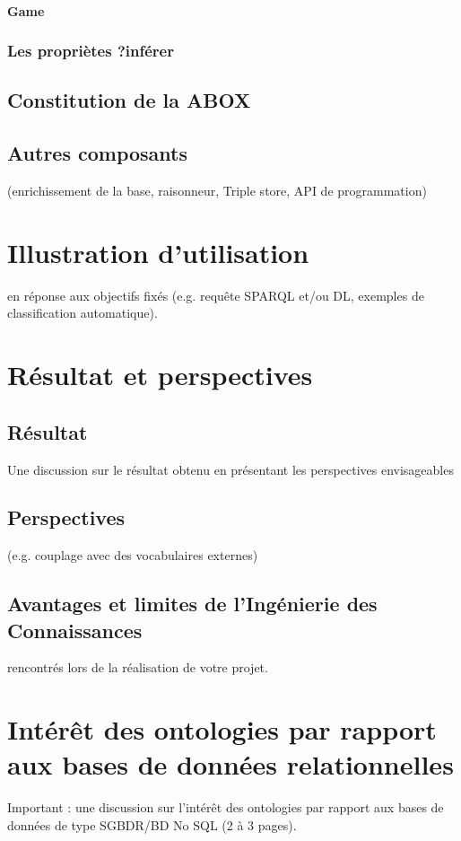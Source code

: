 \documentclass[oneside,13pt,a4paper]{article}
\begin{document}
\paragraph{Game}

\subsubsection{Les propriètes ?inférer}

\subsection{Constitution de la ABOX}


\subsection{Autres composants}

(enrichissement de la base, raisonneur, Triple store, API de programmation)


\section{Illustration d'utilisation}

en réponse aux objectifs fixés (e.g. requête SPARQL
et/ou DL, exemples de classification automatique).

\section{Résultat et perspectives}

\subsection{Résultat}

Une discussion sur le résultat obtenu en présentant les perspectives envisageables

\subsection{Perspectives}

(e.g. couplage avec des vocabulaires externes)

\subsection{Avantages et limites de l’Ingénierie des Connaissances}

rencontrés lors de la réalisation de votre projet.

\section{Intérêt des ontologies par rapport aux bases de données relationnelles}

Important : une discussion sur l’intérêt des ontologies par rapport aux bases de données de
type SGBDR/BD No SQL (2 à 3 pages).
\end{document}

